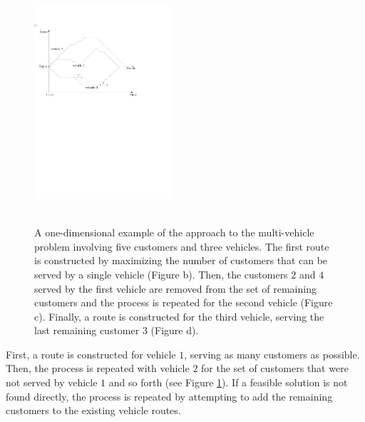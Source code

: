 \documentclass[dissertation,draft*]{aaltoseries}
\newtheorem*{definition}{Definition}
\begin{document}
\begin{figure}[ht]
\includegraphics[width=0.45\textwidth]{greedy07b.pdf}  \\ \ \\   
\caption{A one-dimensional example of the approach to the multi-vehicle problem involving five customers 
and three vehicles. The first route is constructed by maximizing 
the number of customers that can be served by a single vehicle (Figure b). 
Then, the customers $2$ and $4$ served by the first vehicle are removed from the set of remaining customers and the process 
is repeated for the second vehicle (Figure c). Finally, a route is constructed for the third vehicle, serving the
last remaining customer $3$ (Figure d).
}
\label{greedyidea}
\end{figure}

First, a route is constructed for vehicle $1$, serving as many 
customers as possible. Then, the process is repeated with vehicle $2$ for the set of customers
that were not served by vehicle $1$ and so forth (see Figure \ref{greedyidea}). 
If a feasible solution is not found directly, %
the process is repeated by attempting to add the remaining customers to the existing vehicle routes. 
% 
\end{document}
